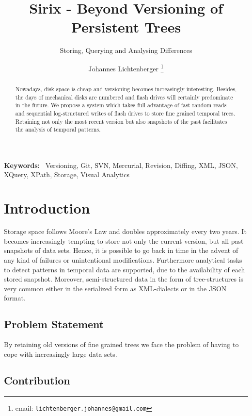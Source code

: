 \documentclass[10pt,twoside,a4paper,twocolumn,abstracton]{scrartcl}
\newenvironment{keywords}%
   {\begin{trivlist}\item[]{\bfseries\sffamily Keywords:}\ }
   {\end{trivlist}}
\begin{document}
\title{Sirix - Beyond Versioning of Persistent Trees}
\subtitle{Storing, Querying and Analysing Differences}
\author{Johannes Lichtenberger \thanks{email: \texttt{lichtenberger.johannes@gmail.com}}}

\maketitle

\begin{abstract}
Nowadays, disk space is cheap and versioning becomes increasingly interesting. Besides, the days of mechanical disks are numbered and flash drives will certainly predominate in the future. We propose a system which takes full advantage of fast random reads and sequential log-structured writes of flash drives to store fine grained temporal trees. Retaining not only the most recent version but also snapshots of the past facilitates the analysis of temporal patterns.
\end{abstract}

\begin{keywords}
Versioning, Git, SVN, Mercurial, Revision, Diffing, XML, JSON, XQuery, XPath, Storage, Visual Analytics
\end{keywords}

\section{Introduction}
Storage space follows Moore's Law and doubles approximately every two years. It becomes increasingly tempting to store not only the current version, but all past snapshots of data sets. Hence, it is possible to go back in time in the advent of any kind of failures or unintentional modifications. Furthermore analytical tasks to detect patterns in temporal data are supported, due to the availability of each stored snapshot. Moreover, semi-structured data in the form of tree-structures is very common either in the serialized form as XML-dialects or in the JSON format.

\subsection{Problem Statement}
By retaining old versions of fine grained trees we face the problem of having to cope with increasingly large data sets.
\subsection{Contribution}
\end{document}
